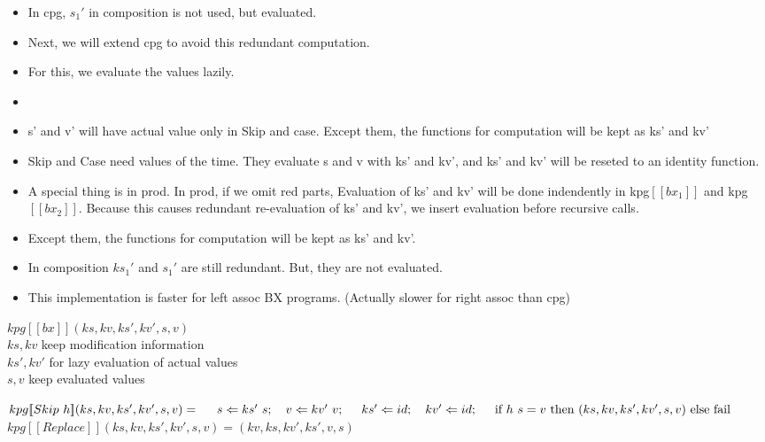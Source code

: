 \documentclass[runningheads]{llncs}
\newcommand{\tab}{\hspace*{5mm}}
\newcommand{\kpg}[7]{kpg [\![#1]\!] (#2, #3, #4, #5, #6, #7)}
\begin{document}
\begin{itemize}
\item In cpg, $s_1'$ in composition is not used, but evaluated.
\item Next, we will extend cpg to avoid this redundant computation.
\item For this, we evaluate the values lazily.
\item []
\item s' and v' will have actual value only in Skip and case. Except them, the functions for computation will be kept as ks' and kv'
\item Skip and Case need values of the time. They evaluate s and v with ks' and kv', and ks' and kv' will be reseted to an identity function.
\item A special thing is in prod. In prod, if we omit red parts,
Evaluation of ks' and kv' will be done indendently in kpg$[\![bx_1]\!]$ and kpg$[\![bx_2]\!]$. Because this causes redundant re-evaluation of ks' and kv', we insert evaluation before recursive calls.
\item Except them, the functions for computation will be kept as ks' and kv'.
\item In composition $ks_1'$ and $s_1'$ are still redundant. But, they are not evaluated.
\item This implementation is faster for left assoc BX programs. (Actually slower for right assoc than cpg)
\end{itemize}

$\kpg{bx}{ks}{kv}{ks'}{kv'}{s}{v}$ \\
    \tab $ks, kv$ keep modification information\\
    \tab $ks', kv'$ for lazy evaluation of actual values\\
    \tab $s, v$ keep evaluated values\\

\vspace{3mm}

$\kpg{Skip \ h}{ks}{kv}{ks'}{kv'}{s}{v} =\\
    \tab s \Leftarrow ks' \ s; \quad v \Leftarrow kv' \ v;\\
    \tab ks' \Leftarrow id; \quad kv' \Leftarrow id;\\
    \tab \text{if} \ h \ s = v \ \text{then} \ (ks, kv, ks', kv', s, v) \ \text{else fail}$\\

$\kpg{Replace}{ks}{kv}{ks'}{kv'}{s}{v} = (kv, ks, kv', ks', v, s)$\\
\end{document}

